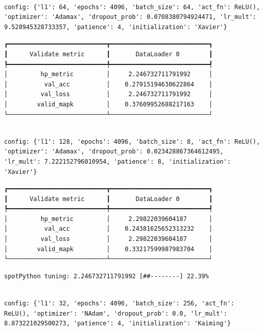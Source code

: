 \documentclass[
  letterpaper,
  DIV=11,
  numbers=noendperiod]{scrreprt}
\begin{document}
\begin{verbatim}

config: {'l1': 64, 'epochs': 4096, 'batch_size': 64, 'act_fn': ReLU(), 'optimizer': 'Adamax', 'dropout_prob': 0.0708380794924471, 'lr_mult': 9.528945328733357, 'patience': 4, 'initialization': 'Xavier'}
\end{verbatim}

\begin{verbatim}
┏━━━━━━━━━━━━━━━━━━━━━━━━━━━┳━━━━━━━━━━━━━━━━━━━━━━━━━━━┓
┃      Validate metric      ┃       DataLoader 0        ┃
┡━━━━━━━━━━━━━━━━━━━━━━━━━━━╇━━━━━━━━━━━━━━━━━━━━━━━━━━━┩
│         hp_metric         │     2.246732711791992     │
│          val_acc          │    0.27915194630622864    │
│         val_loss          │     2.246732711791992     │
│        valid_mapk         │    0.37609952688217163    │
└───────────────────────────┴───────────────────────────┘
\end{verbatim}

\begin{verbatim}

config: {'l1': 128, 'epochs': 4096, 'batch_size': 8, 'act_fn': ReLU(), 'optimizer': 'Adamax', 'dropout_prob': 0.023428867364612495, 'lr_mult': 7.222152796010954, 'patience': 8, 'initialization': 'Xavier'}
\end{verbatim}

\begin{verbatim}
┏━━━━━━━━━━━━━━━━━━━━━━━━━━━┳━━━━━━━━━━━━━━━━━━━━━━━━━━━┓
┃      Validate metric      ┃       DataLoader 0        ┃
┡━━━━━━━━━━━━━━━━━━━━━━━━━━━╇━━━━━━━━━━━━━━━━━━━━━━━━━━━┩
│         hp_metric         │     2.29822039604187      │
│          val_acc          │    0.24381625652313232    │
│         val_loss          │     2.29822039604187      │
│        valid_mapk         │    0.33217599987983704    │
└───────────────────────────┴───────────────────────────┘
\end{verbatim}

\begin{verbatim}
spotPython tuning: 2.246732711791992 [##--------] 22.39% 
\end{verbatim}

\begin{verbatim}

config: {'l1': 32, 'epochs': 4096, 'batch_size': 256, 'act_fn': ReLU(), 'optimizer': 'NAdam', 'dropout_prob': 0.0, 'lr_mult': 8.873221029500273, 'patience': 4, 'initialization': 'Kaiming'}
\end{verbatim}
\end{document}
